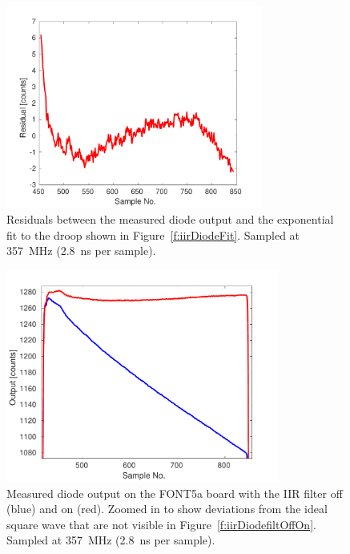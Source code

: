 \begin{figure}
  \centering
  \includegraphics[width=0.75\textwidth]{Figures/commissioning/iirDiodeFitResid}
  \caption{Residuals between the measured diode output and the exponential fit to the droop shown in Figure~\ref{f:iirDiodeFit}. Sampled at 357~MHz (2.8~ns per sample).}
  \label{f:iirDiodeFitResid}
\end{figure}

\begin{figure}
  \centering
  \includegraphics[width=0.8\textwidth]{Figures/commissioning/iirDiodeFiltOffOn_zoom}
  \caption{Measured diode output on the FONT5a board with the IIR filter off (blue) and on (red). Zoomed in to show deviations from the ideal square wave that are not visible in Figure~\ref{f:iirDiodefiltOffOn}. Sampled at 357~MHz (2.8~ns per sample).}
  \label{f:iirDiodefiltOffOn_zoom}
\end{figure}

